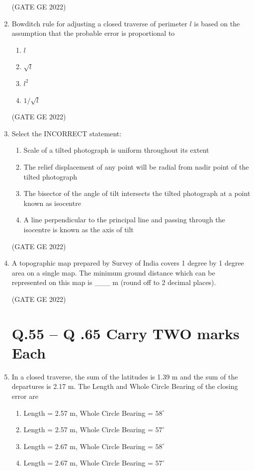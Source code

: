 \documentclass[a4paper, 11pt]{article}
\begin{document}
\begin{enumerate}
\hfill (GATE GE 2022)

\item Bowditch rule for adjusting a closed traverse of perimeter $l$ is based on the assumption that the probable error is proportional to
\begin{enumerate}
    \item $l$
    \item $\sqrt{l}$
    \item $l^2$
    \item $1/\sqrt{l}$
\end{enumerate}

\hfill (GATE GE 2022)

\item Select the INCORRECT statement:
\begin{enumerate}
    \item Scale of a tilted photograph is uniform throughout its extent
    \item The relief displacement of any point will be radial from nadir point of the tilted photograph
    \item The bisector of the angle of tilt intersects the tilted photograph at a point known as isocentre
    \item A line perpendicular to the principal line and passing through the isocentre is known as the axis of tilt
\end{enumerate}

\hfill (GATE GE 2022)

\item A topographic map prepared by Survey of India covers 1 degree by 1 degree area on a single map. The minimum ground distance which can be represented on this map is \_\_\_ m (round off to 2 decimal places).

\hfill (GATE GE 2022)

\section{\textbf{Q.55 – Q .65 Carry TWO marks Each}}

\item In a closed traverse, the sum of the latitudes is 1.39 m and the sum of the departures is 2.17 m. The Length and Whole Circle Bearing of the closing error are
\begin{enumerate}
    \item Length = 2.57 m, Whole Circle Bearing = $58^\circ$
    \item Length = 2.57 m, Whole Circle Bearing = $57^\circ$
    \item Length = 2.67 m, Whole Circle Bearing = $58^\circ$
    \item Length = 2.67 m, Whole Circle Bearing = $57^\circ$
\end{enumerate}


\end{enumerate}
\end{document}
